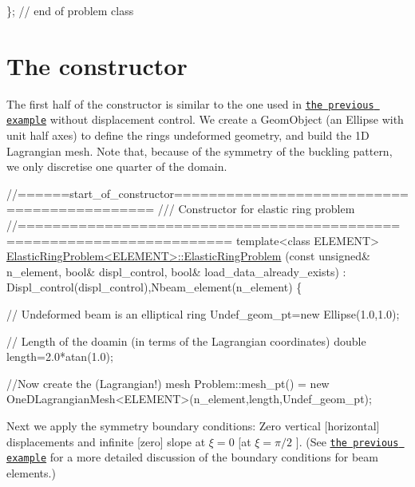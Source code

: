 \begin{DoxyCodeInclude}
\}; \textcolor{comment}{// end of problem class}

\end{DoxyCodeInclude}




\hypertarget{index_constructor}{}\section{The constructor}\label{index_constructor}
The first half of the constructor is similar to the one used in \href{../../tensioned_string/html/index.html}{\tt the previous example} without displacement control. We create a {\ttfamily Geom\+Object} (an {\ttfamily Ellipse} with unit half axes) to define the ring\textquotesingle{}s undeformed geometry, and build the 1D Lagrangian mesh. Note that, because of the symmetry of the buckling pattern, we only discretise one quarter of the domain.

 
\begin{DoxyCodeInclude}
\textcolor{comment}{//======start\_of\_constructor============================================}
\textcolor{comment}{/// Constructor for elastic ring problem}
\textcolor{comment}{}\textcolor{comment}{//======================================================================}
\textcolor{keyword}{template}<\textcolor{keyword}{class} ELEMENT>
\hyperlink{classElasticRingProblem_a46779ff320754561750e22216f7605e3}{ElasticRingProblem<ELEMENT>::ElasticRingProblem}
(\textcolor{keyword}{const} \textcolor{keywordtype}{unsigned}& n\_element, \textcolor{keywordtype}{bool}& displ\_control, \textcolor{keywordtype}{bool}& load\_data\_already\_exists) : 
 Displ\_control(displ\_control),Nbeam\_element(n\_element)
\{

 \textcolor{comment}{// Undeformed beam is an elliptical ring }
 Undef\_geom\_pt=\textcolor{keyword}{new} Ellipse(1.0,1.0); 

 \textcolor{comment}{// Length of the doamin (in terms of the Lagrangian coordinates)}
 \textcolor{keywordtype}{double} length=2.0*atan(1.0);

 \textcolor{comment}{//Now create the (Lagrangian!) mesh}
 Problem::mesh\_pt() = 
  \textcolor{keyword}{new} OneDLagrangianMesh<ELEMENT>(n\_element,length,Undef\_geom\_pt); 

\end{DoxyCodeInclude}


Next we apply the symmetry boundary conditions\+: Zero vertical \mbox{[}horizontal\mbox{]} displacements and infinite \mbox{[}zero\mbox{]} slope at $ \xi =0 $ \mbox{[}at $ \xi =\pi/2 $ \mbox{]}. (See \href{../../tensioned_string/html/index.html}{\tt the previous example} for a more detailed discussion of the boundary conditions for beam elements.)


